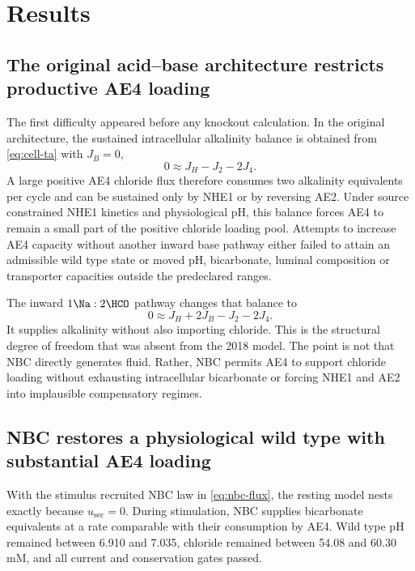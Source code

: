 \section{Results}
\label{sec:results}

\subsection{The original acid--base architecture restricts productive AE4 loading}

The first difficulty appeared before any knockout calculation. In the original architecture, the sustained intracellular alkalinity balance is obtained from \cref{eq:cell-ta} with $J_B=0$,
\[
0\approx J_H-J_2-2J_4.
\]
A large positive AE4 chloride flux therefore consumes two alkalinity equivalents per cycle and can be sustained only by NHE1 or by reversing AE2. Under source constrained NHE1 kinetics and physiological pH, this balance forces AE4 to remain a small part of the positive chloride loading pool. Attempts to increase AE4 capacity without another inward base pathway either failed to attain an admissible wild type state or moved pH, bicarbonate, luminal composition or transporter capacities outside the predeclared ranges.

The inward $1\Na:2\HCO$ pathway changes that balance to
\begin{equation}
\label{eq:alkalinity-balance}
0\approx J_H+2J_B-J_2-2J_4.
\end{equation}
It supplies alkalinity without also importing chloride. This is the structural degree of freedom that was absent from the 2018 model. The point is not that NBC directly generates fluid. Rather, NBC permits AE4 to support chloride loading without exhausting intracellular bicarbonate or forcing NHE1 and AE2 into implausible compensatory regimes.

\subsection{NBC restores a physiological wild type with substantial AE4 loading}

With the stimulus recruited NBC law in \cref{eq:nbc-flux}, the resting model nests exactly because $u_{\mathrm{sec}}=0$. During stimulation, NBC supplies bicarbonate equivalents at a rate comparable with their consumption by AE4. Wild type pH remained between 6.910 and 7.035, chloride remained between 54.08 and 60.30 mM, and all current and conservation gates passed.

